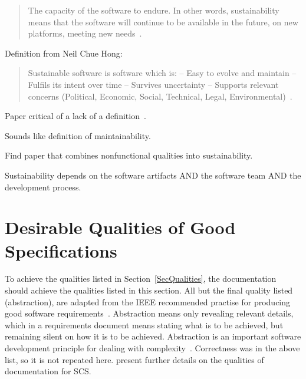 \documentclass[letterpaper,cleveref]{lipics-v2019}
\theoremstyle{definition}
\begin{document}
\begin{quotation}
  \noindent The capacity of the software to endure. In other words,
  sustainability means that the software will continue to be available in the
  future, on new platforms, meeting new needs~\cite{Katz2016}.
\end{quotation}

Definition from Neil Chue Hong:
\begin{quotation}
\noindent Sustainable software is software which is:
-- Easy to evolve and maintain
-- Fulfils its intent over time
-- Survives uncertainty
-- Supports relevant concerns (Political, Economic, Social, Technical,
Legal, Environmental)~\cite{Katz2016}.
\end{quotation}

Paper critical of a lack of a definition~\cite{VentersEtAl2014}.

Sounds like definition of maintainability.

Find paper that combines nonfunctional qualities into sustainability.

Sustainability depends on the software artifacts AND the software team AND the
development process.

\section{Desirable Qualities of Good Specifications} \label{SecDesirableQs}

To achieve the qualities listed in Section~\ref{SecQualities}, the documentation
should achieve the qualities listed in this section.  All but the final quality
listed (abstraction), are adapted from the IEEE recommended practise for
producing good software requirements~\cite{IEEE1998}.  Abstraction means only
revealing relevant details, which in a requirements document means stating what
is to be achieved, but remaining silent on how it is to be achieved.
Abstraction is an important software development principle for dealing with
complexity~\cite[p.~40]{GhezziEtAl2003}.  Correctness was in the above list, so
it is not repeated here.  \citet{SmithAndKoothoor2016} present further details
on the qualities of documentation for SCS.
\end{document}
